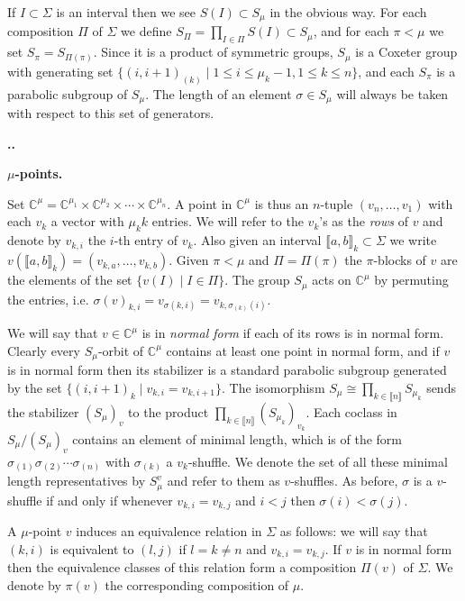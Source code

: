 \documentclass[11pt,fleqn]{amsart}
\renewcommand\thesection{\arabic{section}}
\newcounter{para}[section]
\renewcommand\thepara{\thesection.\arabic{para}}
\def\paragraph{%
 \noindent
 \refstepcounter{para}%
 \textbf{\thepara.}\hspace{1ex}%
}
\newcommand\about[1]{%
 {\bfseries#1.}%
}
\newcommand\CC{\mathbb C}
\newcommand\interval[1]{\llbracket #1 \rrbracket}
\begin{document}
If $I \subset \Sigma$ is an interval then we see $S(I) \subset S_\mu$ in the 
obvious way. For each composition $\Pi$ of $\Sigma$ we define $S_\Pi = 
\prod_{I \in \Pi} S(I) \subset S_\mu$, and for each $\pi < \mu$ we set $S_\pi 
= S_{\Pi(\pi)}$. Since it is a product of symmetric groups, $S_\mu$ is a 
Coxeter group with generating set $\{(i,i+1)_{(k)} \mid 1 \leq i \leq \mu_k-1, 
1 \leq k \leq n\}$, and each $S_\pi$ is a parabolic subgroup of $S_\mu$. The
length of an element $\sigma \in S_\mu$ will always be taken with respect to
this set of generators.

\paragraph
\about{$\mu$-points}
\label{mu-points}
Set $\CC^\mu = \CC^{\mu_1} \times \CC^{\mu_2} \times \cdots \times 
\CC^{\mu_n}$. A point in $\CC^\mu$ is thus an $n$-tuple $(v_n, \ldots, v_1)$ 
with each $v_k$ a vector with $\mu_kk$ entries. We will refer to the $v_k$'s 
as the \emph{rows} of $v$ and denote by $v_{k,i}$ the $i$-th entry of $v_k$. 
Also given an interval $\interval{a,b}_k \subset \Sigma$ we write 
$v(\interval{a,b}_k) = (v_{k,a},\ldots, v_{k,b})$. Given $\pi < \mu$ and $\Pi 
= \Pi(\pi)$ the $\pi$-blocks of $v$ are the elements of the set $\{v(I) \mid 
I \in \Pi\}$. The group $S_\mu$ acts on $\CC^\mu$ by permuting the entries, 
i.e. $\sigma(v)_{k,i} = v_{\sigma(k,i)} = v_{k,\sigma_{(k)}(i)}$. 

We will say that $v \in \CC^\mu$ is in \emph{normal form} if each of its rows 
is in normal form. Clearly every $S_\mu$-orbit of $\CC^\mu$ contains at least 
one point in normal form, and if $v$ is in normal form then its stabilizer is 
a standard parabolic subgroup generated by the set $\{(i,i+1)_k \mid v_{k,i} = 
v_{k,i+1}\}$. The isomorphism $S_\mu \cong \prod_{k \in \interval n} 
S_{\mu_k}$ sends the stabilizer $(S_\mu)_v$ to the product $\prod_{k \in 
\interval n} (S_{\mu_k})_{v_k}$. Each coclass in $S_\mu/ (S_\mu)_v$ contains 
an element of minimal length, which is of the form $\sigma_{(1)} \sigma_{(2)} 
\cdots \sigma_{(n)}$ with $\sigma_{(k)}$ a $v_k$-shuffle. We denote the set of 
all these minimal length representatives by $S_\mu^v$ and refer to them as 
$v$-shuffles. As before, $\sigma$ is a $v$-shuffle if and only if whenever
$v_{k,i} = v_{k,j}$ and $i<j$ then $\sigma(i) < \sigma(j)$.

A $\mu$-point $v$ induces an equivalence relation in $\Sigma$ as follows:
we will say that $(k,i)$ is equivalent to $(l,j)$ if $l=k \neq n$ and $v_{k,i}
= v_{k,j}$. If $v$ is in normal form then the equivalence classes of this
relation form a composition $\Pi(v)$ of $\Sigma$. We denote by $\pi(v)$ the
corresponding composition of $\mu$.
\end{document}
